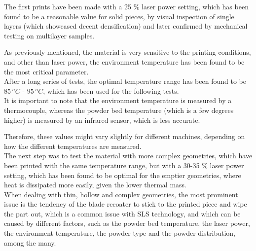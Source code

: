 \documentclass{article}
\begin{document}
        The first prints have been made with a 25 \%  laser power setting, which has been found to be 
        a reasonable value for solid pieces, by visual inspection of single layers (which showcased 
        decent densification) and later confirmed by 
        mechanical testing on multilayer samples. 
        
        \clearpage

%

        As previously mentioned, the material is very sensitive to the printing conditions, and other than laser power,
        the environment temperature has been found to be the most critical parameter. \\ 

        After a long series of tests, the optimal temperature range has been found to be $85 \ ^oC$ - $95 \ ^oC$, which has been
        used for the following tests. \\ 

        It is important to note that the environment temperature is measured by a thermocouple, whereas the 
        powder bed temperature (which is a few degrees higher) is measured by an infrared sensor, which  
        is less accurate. 

        Therefore, these values might vary slightly for different machines, depending on how the different 
        temperatures are measured. \\ 

        The next step was to test the material with more complex geometries, which have been printed with the same 
        temperature range, but with a 30-35 \% laser power setting, which has been found to be optimal for the 
        emptier geometries, where heat is dissipated more easily, given the lower thermal mass. \\ 

        When dealing with thin, hollow and complex geometries, the most prominent issue is the tendency of the 
        blade recoater to stick to the printed piece and wipe the part out, which is a common 
        issue with SLS technology, and which 
        can be caused by different factors, such as the powder bed temperature, the laser power, the 
        environment temperature, the powder type and the powder distribution, among the many. \\ 
\end{document}

